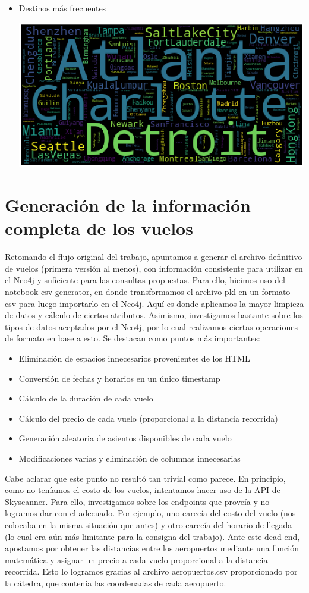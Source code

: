 \documentclass[a4paper,11pt]{article}
\begin{document}
\begin{itemize}
\begin{center}
\end{center}
\item Destinos más frecuentes
\begin{center}
\includegraphics[scale=0.35]{./imagenes/wordcloud.png}
\end{center}
\end{itemize}
\newpage
\section{Generación de la información completa de los vuelos}
Retomando el flujo original del trabajo, apuntamos a generar el archivo definitivo de vuelos (primera versión al menos), con información consistente para utilizar en el Neo4j y suficiente para las consultas propuestas.
Para ello, hicimos uso del notebook csv generator, en donde transformamos el archivo pkl en un formato csv para luego importarlo en el Neo4j.
Aquí es donde aplicamos la mayor limpieza de datos y cálculo de ciertos atributos. Asimismo, investigamos bastante sobre los tipos de datos aceptados por el Neo4j, por lo cual realizamos ciertas operaciones de formato en base a esto. Se destacan como puntos más importantes:
\begin{itemize}
\item Eliminación de espacios innecesarios provenientes de los HTML
\item Conversión de fechas y horarios en un único timestamp
\item Cálculo de la duración de cada vuelo
\item Cálculo del precio de cada vuelo (proporcional a la distancia recorrida)
\item Generación aleatoria de asientos disponibles de cada vuelo
\item Modificaciones varias y eliminación de columnas innecesarias
\end{itemize}
Cabe aclarar que este punto no resultó tan trivial como parece.
En principio, como no teníamos el costo de los vuelos, intentamos hacer uso de la API de Skyscanner. Para ello, investigamos sobre los endpoints que proveía y no logramos dar con el adecuado. Por ejemplo, uno carecía del costo del vuelo (nos colocaba en la misma situación que antes) y otro carecía del horario de llegada (lo cual era aún más limitante para la consigna del trabajo).
Ante este dead-end, apostamos por obtener las distancias entre los aeropuertos mediante una función matemática y asignar un precio a cada vuelo proporcional a la distancia recorrida. Esto lo logramos gracias al archivo aeropuertos.csv proporcionado por la cátedra, que contenía las coordenadas de cada aeropuerto.
\newpage
\end{document}

